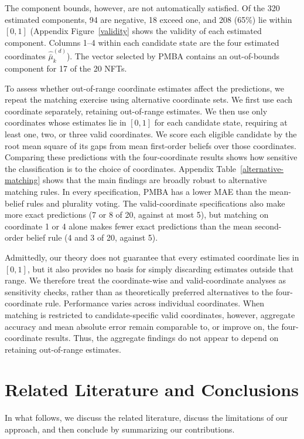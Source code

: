 \documentclass[12pt,reqno]{amsart}
\begin{document}
The component bounds, however, are not automatically satisfied.
Of the 320 estimated components, 94 are negative, 18 exceed one,
and 208 (65\%) lie within $[0,1]$ (Appendix Figure~\ref{validity}  shows the validity of each estimated component. Columns 1--4 within each candidate state are the four estimated coordinates $\hat{\bar\mu}_k^{(d)}$). The vector selected by PMBA
contains an out-of-bounds component for 17 of the 20 NFTs.

To assess whether out-of-range coordinate estimates affect the predictions, we repeat the matching exercise using alternative coordinate sets. We first use each coordinate separately, retaining out-of-range estimates. We then use only coordinates whose estimates lie in \([0,1]\) for each candidate state, requiring at least one, two, or three valid coordinates. We score each eligible candidate by the root mean square of its gaps from mean first-order beliefs over those coordinates. Comparing these predictions with the four-coordinate results shows how sensitive the classification is to the choice of coordinates. Appendix Table~\ref{alternative-matching} shows that the main findings are broadly robust to alternative matching rules.  In every specification, PMBA has a lower MAE than the mean-belief rules and plurality voting. The valid-coordinate specifications also make more exact predictions (7 or 8 of 20, against at most 5), but matching on coordinate 1 or 4 alone makes fewer exact predictions than the mean second-order belief rule (4 and 3 of 20, against 5).

Admittedly, our theory does not guarantee that every estimated coordinate  lies in $[0,1]$, but it also provides no basis for simply discarding estimates outside that range. We therefore treat the coordinate-wise and valid-coordinate analyses as sensitivity checks, rather than as theoretically preferred alternatives to the four-coordinate rule. Performance varies across individual coordinates. When matching is restricted to candidate-specific valid coordinates, however, aggregate accuracy and mean absolute error remain comparable to, or improve on, the four-coordinate results. Thus, the aggregate findings do not appear to depend on retaining out-of-range estimates.

\section{Related Literature and Conclusions}\label{sec:rellit}
In what follows, we discuss the related literature, discuss the limitations of our approach, and then conclude by summarizing our contributions.
\end{document}
